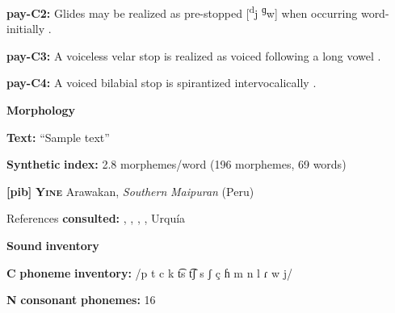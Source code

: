 \begin{styleBody}
\textbf{pay-C2:} Glides may be realized as pre-stopped [\textsuperscript{d}j \textsuperscript{ɡ}w] when occurring word-initially \citep[16]{Holt1999}.
\end{styleBody}

\begin{styleBody}
\textbf{pay-C3:} A voiceless velar stop is realized as voiced following a long vowel \citep[15-16]{Holt1999}.
\end{styleBody}

\begin{styleBody}
\textbf{pay-C4:} A voiced bilabial stop is spirantized intervocalically \citep[16]{Holt1999}.
\end{styleBody}

\begin{styleBody}
\textbf{Morphology}
\end{styleBody}

\begin{styleBody}
\textbf{Text:} “Sample text” \citep[79-80]{Holt1999}
\end{styleBody}

\begin{styleBody}
\textbf{Synthetic} \textbf{index:} 2.8 morphemes/word (196 morphemes, 69 words)
\end{styleBody}

\begin{styleBody}
\textbf{[pib]}   \textbf{\textsc{Yine}}  Arawakan, \textit{Southern} \textit{Maipuran} (Peru)
\end{styleBody}

\begin{styleBody}
References \textbf{consulted:} \citet{Hanson2010}, \citet{Lin1997}, \citet{Matteson1965}, \citet{Parker1989}, Urquía \citet{SebastiánMarlett2008}
\end{styleBody}

\begin{styleBody}
\textbf{Sound} \textbf{inventory}
\end{styleBody}

\begin{styleBody}
\textbf{C} \textbf{phoneme} \textbf{inventory:} /p t c k t͡s t͡ʃ s ʃ ç ɦ m n l ɾ w j/
\end{styleBody}

\begin{styleBody}
\textbf{N} \textbf{consonant} \textbf{phonemes:} 16
\end{styleBody}

